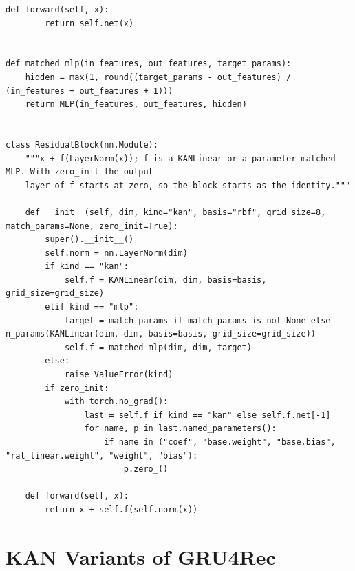 \documentclass[12pt,a4paper]{report}
\begin{document}
\begin{lstlisting}[style=pythonstyle, caption={KAN layer, residual block and MLP control (\texttt{kanrec/kan.py}).}]
    def forward(self, x):
        return self.net(x)


def matched_mlp(in_features, out_features, target_params):
    hidden = max(1, round((target_params - out_features) / (in_features + out_features + 1)))
    return MLP(in_features, out_features, hidden)


class ResidualBlock(nn.Module):
    """x + f(LayerNorm(x)); f is a KANLinear or a parameter-matched MLP. With zero_init the output
    layer of f starts at zero, so the block starts as the identity."""

    def __init__(self, dim, kind="kan", basis="rbf", grid_size=8, match_params=None, zero_init=True):
        super().__init__()
        self.norm = nn.LayerNorm(dim)
        if kind == "kan":
            self.f = KANLinear(dim, dim, basis=basis, grid_size=grid_size)
        elif kind == "mlp":
            target = match_params if match_params is not None else n_params(KANLinear(dim, dim, basis=basis, grid_size=grid_size))
            self.f = matched_mlp(dim, dim, target)
        else:
            raise ValueError(kind)
        if zero_init:
            with torch.no_grad():
                last = self.f if kind == "kan" else self.f.net[-1]
                for name, p in last.named_parameters():
                    if name in ("coef", "base.weight", "base.bias", "rat_linear.weight", "weight", "bias"):
                        p.zero_()

    def forward(self, x):
        return x + self.f(self.norm(x))
\end{lstlisting}

\chapter{KAN Variants of GRU4Rec}
\label{app:session}
\end{document}

